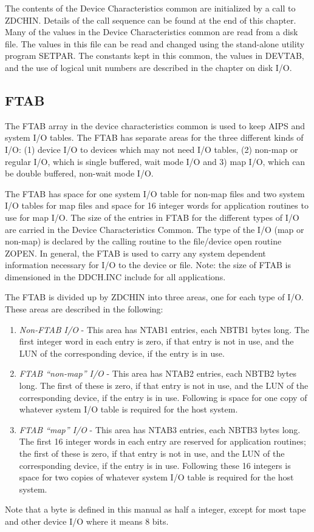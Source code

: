The contents of the Device Characteristics common are initialized by a
call to ZDCHIN. Details of the call sequence can be
found at the end of this chapter.  Many of the values in the Device
Characteristics common are read
from a disk file. The values in this file can be read and changed
using the stand-alone utility program SETPAR. The
constants kept in this common, the values in DEVTAB, and the use of
logical unit numbers are described in the chapter on disk I/O.

\subsection{FTAB }
The FTAB array in the device characteristics common is used to keep
AIPS and system I/O tables.  The FTAB has separate areas for the three
different kinds of I/O: (1) device I/O to devices which may not need
I/O tables, (2) non-map or regular I/O, which is single buffered, wait
mode I/O and 3) map I/O, which can be double buffered, non-wait mode
I/O.

The FTAB has space for one system I/O table for non-map files and two
system I/O tables for map files and space for 16 integer words for
application routines to use for map I/O. The size of the entries in
FTAB for the different types of I/O are carried in the Device
Characteristics Common.  The type of the I/O (map or non-map) is
declared by the calling routine to the file/device open routine
ZOPEN.
In general, the FTAB is used to carry any system dependent information
necessary for I/O to the device or file.  Note: the size of FTAB is
dimensioned in the DDCH.INC include for all applications.

The FTAB is divided up by ZDCHIN into three areas, one for each type
of I/O.  These areas are described in the following:
\begin{enumerate} %
\item {\it Non-FTAB I/O}  - This area has NTAB1 entries, each NBTB1 bytes long.
The first integer word in each entry is zero, if that entry is not in
use, and the LUN of the corresponding device, if the entry is in use.
\item {\it FTAB ``non-map'' I/O}  - This area has NTAB2 entries, each
NBTB2 bytes long.  The first of these is zero, if that entry is not in
use, and  the LUN of the corresponding device, if the entry is in use.
Following is space for one copy of whatever system I/O table is
required for the host system.
\item {\it FTAB ``map'' I/O}  - This area has NTAB3 entries, each NBTB3 bytes
long.  The first 16 integer words in each entry are reserved for
application routines;  the first of these is zero, if that entry is
not in use, and the LUN of the corresponding device, if the entry is
in use.  Following these 16 integers is space for two copies of
whatever system I/O table is required for the host system.
\end{enumerate} %
Note that a byte is defined in this manual as half a integer,
except for most tape and other device I/O where it means 8 bits.

